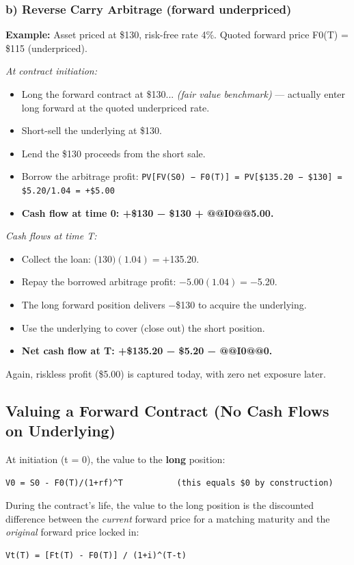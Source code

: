 \documentclass[12pt,openany]{book}
\theoremstyle{definition}
\theoremstyle{remark}
\begin{document}
\subsubsection{b) Reverse Carry Arbitrage (forward underpriced)}

\textbf{Example:} Asset priced at \$130, risk-free rate 4\%. Quoted forward price F0(T) = \$115 (underpriced).

\emph{At contract initiation:}
\begin{itemize}
\item Long the forward contract at \$130... \emph{(fair value benchmark)} — actually enter long forward at the quoted underpriced rate.
\item Short-sell the underlying at \$130.
\item Lend the \$130 proceeds from the short sale.
\item Borrow the arbitrage profit: \texttt{PV[FV(S0) − F0(T)] = PV[\$135.20 − \$130] = \$5.20/1.04 = +\$5.00}
\item \textbf{Cash flow at time 0: +\$130 − \$130 + @@I0@@5.00.}
\end{itemize}
\emph{Cash flows at time T:}
\begin{itemize}
\item Collect the loan: (\(130)(1.04) = +\)135.20.
\item Repay the borrowed arbitrage profit: −\(5.00(1.04) = -\)5.20.
\item The long forward position delivers −\$130 to acquire the underlying.
\item Use the underlying to cover (close out) the short position.
\item \textbf{Net cash flow at T: +\$135.20 − \$5.20 − @@I0@@0.}
\end{itemize}
Again, riskless profit (\$5.00) is captured today, with zero net exposure later.

\subsection{Valuing a Forward Contract (No Cash Flows on Underlying)}

At initiation (t = 0), the value to the \textbf{long} position:
\begin{lstlisting}[style=notesCode]
V0 = S0 - F0(T)/(1+rf)^T           (this equals $0 by construction)
\end{lstlisting}

During the contract's life, the value to the long position is the discounted difference between the \emph{current} forward price for a matching maturity and the \emph{original} forward price locked in:
\begin{lstlisting}[style=notesCode]
Vt(T) = [Ft(T) - F0(T)] / (1+i)^(T-t)
\end{lstlisting}
\end{document}

